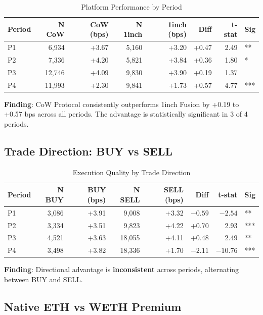 \documentclass[11pt,a4paper]{article}
\begin{document}
\begin{table}[H]
\centering
\caption{Platform Performance by Period}
\begin{tabular}{lrrrrrrl}
\toprule
\textbf{Period} & \textbf{N CoW} & \textbf{CoW (bps)} & \textbf{N 1inch} & \textbf{1inch (bps)} & \textbf{Diff} & \textbf{t-stat} & \textbf{Sig} \\
\midrule
P1 & 6,934 & +3.67 & 5,160 & +3.20 & +0.47 & 2.49 & ** \\
P2 & 7,336 & +4.20 & 5,821 & +3.84 & +0.36 & 1.80 & * \\
P3 & 12,746 & +4.09 & 9,830 & +3.90 & +0.19 & 1.37 & \\
P4 & 11,993 & +2.30 & 9,841 & +1.73 & +0.57 & 4.77 & *** \\
\bottomrule
\end{tabular}
\end{table}

\textbf{Finding}: CoW Protocol consistently outperforms 1inch Fusion by +0.19 to +0.57 bps across all periods. The advantage is statistically significant in 3 of 4 periods.

\subsection{Trade Direction: BUY vs SELL}

\begin{table}[H]
\centering
\caption{Execution Quality by Trade Direction}
\begin{tabular}{lrrrrrrl}
\toprule
\textbf{Period} & \textbf{N BUY} & \textbf{BUY (bps)} & \textbf{N SELL} & \textbf{SELL (bps)} & \textbf{Diff} & \textbf{t-stat} & \textbf{Sig} \\
\midrule
P1 & 3,086 & +3.91 & 9,008 & +3.32 & $-0.59$ & $-2.54$ & ** \\
P2 & 3,334 & +3.51 & 9,823 & +4.22 & +0.70 & 2.93 & *** \\
P3 & 4,521 & +3.63 & 18,055 & +4.11 & +0.48 & 2.49 & ** \\
P4 & 3,498 & +3.82 & 18,336 & +1.70 & $-2.11$ & $-10.76$ & *** \\
\bottomrule
\end{tabular}
\end{table}

\textbf{Finding}: Directional advantage is \textbf{inconsistent} across periods, alternating between BUY and SELL.

\subsection{Native ETH vs WETH Premium}
\end{document}
